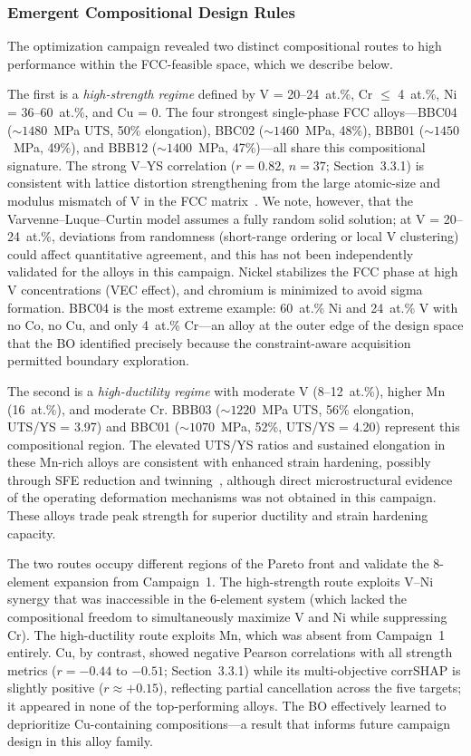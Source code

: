 \documentclass[preprint,12pt,times]{elsarticle}  %
\begin{document}
\subsubsection{Emergent Compositional Design Rules}

The optimization campaign revealed two distinct compositional routes to high performance within the FCC-feasible space, which we describe below.

The first is a \emph{high-strength regime} defined by V = 20--24~at.\%, Cr $\leq$ 4~at.\%, Ni = 36--60~at.\%, and Cu = 0. The four strongest single-phase FCC alloys---BBC04 (${\sim}1480$~MPa UTS, 50\% elongation), BBC02 (${\sim}1460$~MPa, 48\%), BBB01 (${\sim}1450$~MPa, 49\%), and BBB12 (${\sim}1400$~MPa, 47\%)---all share this compositional signature. The strong V--YS correlation ($r = 0.82$, $n = 37$; Section~3.3.1) is consistent with lattice distortion strengthening from the large atomic-size and modulus mismatch of V in the FCC matrix~\cite{varvenne2016theory}. We note, however, that the Varvenne--Luque--Curtin model assumes a fully random solid solution; at V = 20--24~at.\%, deviations from randomness (short-range ordering or local V clustering) could affect quantitative agreement, and this has not been independently validated for the alloys in this campaign. Nickel stabilizes the FCC phase at high V concentrations (VEC effect), and chromium is minimized to avoid sigma formation. BBC04 is the most extreme example: 60~at.\% Ni and 24~at.\% V with no Co, no Cu, and only 4~at.\% Cr---an alloy at the outer edge of the design space that the BO identified precisely because the constraint-aware acquisition permitted boundary exploration.

The second is a \emph{high-ductility regime} with moderate V (8--12~at.\%), higher Mn (16~at.\%), and moderate Cr. BBB03 (${\sim}1220$~MPa UTS, 56\% elongation, UTS/YS = 3.97) and BBC01 (${\sim}1070$~MPa, 52\%, UTS/YS = 4.20) represent this compositional region. The elevated UTS/YS ratios and sustained elongation in these Mn-rich alloys are consistent with enhanced strain hardening, possibly through SFE reduction and twinning~\cite{li2016metastable, otto2013influences}, although direct microstructural evidence of the operating deformation mechanisms was not obtained in this campaign. These alloys trade peak strength for superior ductility and strain hardening capacity.

The two routes occupy different regions of the Pareto front and validate the 8-element expansion from Campaign~1. The high-strength route exploits V--Ni synergy that was inaccessible in the 6-element system (which lacked the compositional freedom to simultaneously maximize V and Ni while suppressing Cr). The high-ductility route exploits Mn, which was absent from Campaign~1 entirely. Cu, by contrast, showed negative Pearson correlations with all strength metrics ($r = -0.44$ to $-0.51$; Section~3.3.1) while its multi-objective corrSHAP is slightly positive ($r \approx +0.15$), reflecting partial cancellation across the five targets; it appeared in none of the top-performing alloys. The BO effectively learned to deprioritize Cu-containing compositions---a result that informs future campaign design in this alloy family.
\end{document}
